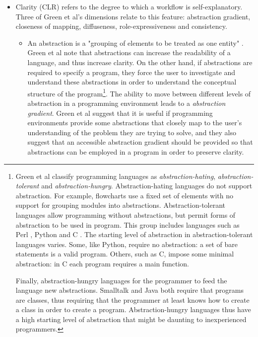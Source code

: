 \documentclass[a4paper,10pt]{scrreprt} \usepackage[utf8]{inputenc}
\begin{document}
\begin{itemize}
\item Clarity (CLR) refers to the degree to which a \gls{workflow} is self-explanatory. Three of Green et al's dimensions relate to this feature: abstraction gradient, closeness of mapping, diffuseness, role-expressiveness and consistency.
\begin{itemize}
\item An abstraction is a "grouping of elements to be treated as one entity" \cite{green_usability_1996}. Green et al note that abstractions can increase the readability of a language, and thus increase clarity. On the other hand, if abstractions are required to specify a program, they force the user to investigate and understand these abstractions in order to understand the conceptual structure of the program\footnote{Green et al classify programming languages as \emph{abstraction-hating}, \emph{abstraction-tolerant} and \emph{abstraction-hungry}. Abstraction-hating languages do not support abstraction. For example, flowcharts use a fixed set of elements with no support for grouping modules into abstractions. Abstraction-tolerant languages allow programming without abstractions, but permit forms of abstraction to be used in program. This group includes languages such as Perl \cite{christiansen_programming_2012}, Python \cite{python_software_foundation_python_2012} and C \cite{iso_jtc_1/sc_22_c_2011}. The 
starting level of abstraction in abstraction-tolerant languages varies. Some, like Python, require no abstraction: a set of bare statements is a valid program. Others, such as C, impose some minimal abstraction: in C each program requires a main function. 

Finally, abstraction-hungry languages for the programmer to feed the language new abstractions. Smalltalk \cite{goldberg_smalltalk-80:_1983} and Java \cite{oracle_jsr_2011} both require that programs are classes, thus requiring that the programmer at least knows how to create a class in order to create a program. Abstraction-hungry languages thus have a high starting level of abstraction that might be daunting to inexperienced programmers.}. The ability to move between different levels of abstraction in a programming environment leads to a \emph{abstraction gradient}. Green et al suggest that it is useful if programming environments provide some abstractions that closely map to the user's understanding of the problem they are trying to solve, and they also suggest that an accessible abstraction gradient should be provided so that abstractions can be employed in a program in order to preserve clarity.


\end{itemize}
\end{itemize}
\end{document}
